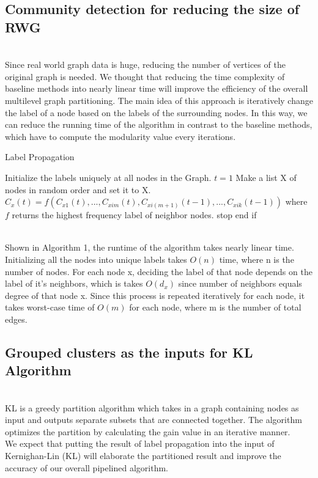 \subsection{Community detection for reducing the size of RWG} \\
Since real world graph data is huge, reducing the number of vertices of the original graph is needed. We thought that reducing the time complexity of baseline methods into nearly linear time will improve the efficiency of the overall multilevel graph partitioning. The main idea of this approach is iteratively change the label of a node based on the labels of the surrounding nodes. In this way, we can reduce the running time of the algorithm in contrast to the baseline methods, which have to compute the modularity value every iterations. \\


\begin{algorithm}
\caption{Label Propagation}
\label{label propagation}
\begin{algorithmic}[1]
    \State Initialize the labels uniquely at all nodes in the Graph.  
    \State $t = 1$
    \State Make a list X of nodes in random order and set it to X.
        \State $C_x(t) = f(C_{x1}(t),...,C_{xim}(t),C_{xi(m+1)}(t-1),...,C_{xik}(t-1))$ 
        \State where $f$ returns the highest frequency label of neighbor nodes.
	\EndFor
	 stop
	 end if
\end{algorithmic}
\end{algorithm} \\

Shown in Algorithm 1, the runtime of the algorithm takes nearly linear time. Initializing all the nodes into unique labels takes $O(n)$ time, where n is the number of nodes. For each node x, deciding the label of that node depends on the label of it's neighbors, which is takes $O(d_x)$ since number of neighbors equals degree of that node x. Since this process is repeated iteratively for each node, it takes worst-case time of $O(m)$ for each node, where m is the number of total edges. \\


\subsection{Grouped clusters as the inputs for KL Algorithm} \\ 
KL is a greedy partition algorithm which takes in a graph containing nodes as input and outputs separate subsets that are connected together. The algorithm optimizes the partition by calculating the gain value in an iterative manner.\\
We expect that putting the result of label propagation into the input of Kernighan-Lin (KL) will elaborate the partitioned result and improve the accuracy of our overall pipelined algorithm.


